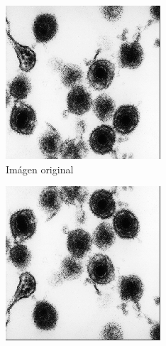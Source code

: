 \documentclass{uc3mpracticas}
\begin{document}
  \begin{figure}[!h]
    \centering
    \begin{subfigure}[b]{0.23\textwidth}
      \includegraphics[width=\textwidth, frame]{Images/og.png}
      \caption{Imágen original}
    \end{subfigure}
    \hfill
    \begin{subfigure}[b]{0.23\textwidth}
      \includegraphics[width=\textwidth, frame]{Images/voltArrAbj.png}

\end{subfigure}
\end{figure}
\end{document}
